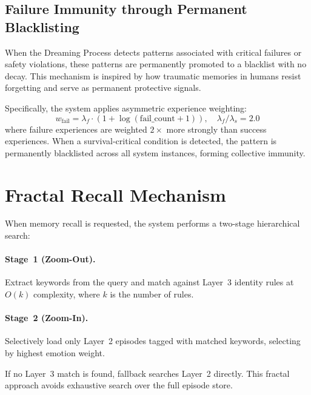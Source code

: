 \documentclass[11pt,a4paper]{article}
\begin{document}
\subsection{Failure Immunity through Permanent Blacklisting}

When the Dreaming Process detects patterns associated with critical failures or safety violations, these patterns are permanently promoted to a blacklist with no decay. This mechanism is inspired by how traumatic memories in humans resist forgetting and serve as permanent protective signals.

Specifically, the system applies asymmetric experience weighting:
\begin{equation}
  w_{\text{fail}} = \lambda_f \cdot (1 + \log(\text{fail\_count} + 1)), \quad \lambda_f / \lambda_s = 2.0
\end{equation}
where failure experiences are weighted $2\times$ more strongly than success experiences. When a survival-critical condition is detected, the pattern is permanently blacklisted across all system instances, forming collective immunity.

\section{Fractal Recall Mechanism}

When memory recall is requested, the system performs a two-stage hierarchical search:

\paragraph{Stage~1 (Zoom-Out).} Extract keywords from the query and match against Layer~3 identity rules at $O(k)$ complexity, where $k$ is the number of rules.

\paragraph{Stage~2 (Zoom-In).} Selectively load only Layer~2 episodes tagged with matched keywords, selecting by highest emotion weight.

If no Layer~3 match is found, fallback searches Layer~2 directly. This fractal approach avoids exhaustive search over the full episode store.

\end{document}
